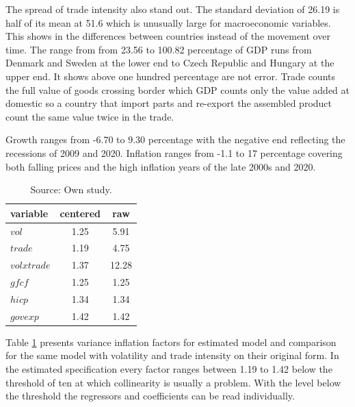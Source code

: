 \vspace{\baselineskip}

The spread of trade intensity also stand out.
The standard deviation of 26.19 is half of its mean at 51.6 which is unusually large for macroeconomic variables.
This shows in the differences between countries instead of the movement over time.
The range from from 23.56 to 100.82 percentage of GDP runs from Denmark and Sweden at the lower end to Czech Republic and Hungary at the upper end.
It shows above one hundred percentage are not error. 
Trade counts the full value of goods crossing border which GDP counts only the value added at domestic so a country that import parts and re-export the assembled product count the same value twice in the trade.

\vspace{\baselineskip}

Growth ranges from -6.70 to 9.30 percentage with the negative end reflecting the recessions of 2009 and 2020.
Inflation ranges from -1.1 to 17 percentage covering both falling prices and the high inflation years of the late 2000s and 2020.


\begin{table}[H]
    \centering
    \caption{Variance inflation factors for the regressors.}
    \vspace{\baselineskip}
    \begin{tabular}{lcc}
        \toprule
        \textbf{variable} & \textbf{centered} & \textbf{raw}\\
        \midrule
        $vol$                  &      1.25 &  5.91\\
        $trade$                &      1.19  & 4.75\\
        $vol x trade$          &      1.37  & 12.28\\
        $gfcf$                 &      1.25  & 1.25\\
        $hicp$                 &      1.34  & 1.34\\
        $govexp$               &      1.42  & 1.42\\
        \bottomrule
    \end{tabular}
    \vspace{\baselineskip}
    \caption*{\footnotesize Source: Own study.}
    \label{tab:vif}
\end{table}

Table \ref{tab:vif} presents variance inflation factors for estimated model and comparison for the same model with volatility and trade intensity on their original form.
In the estimated specification every factor ranges between 1.19 to 1.42 below the threshold of ten at which collinearity is usually a problem.
With the level below the threshold the regressors and coefficients can be read individually.

